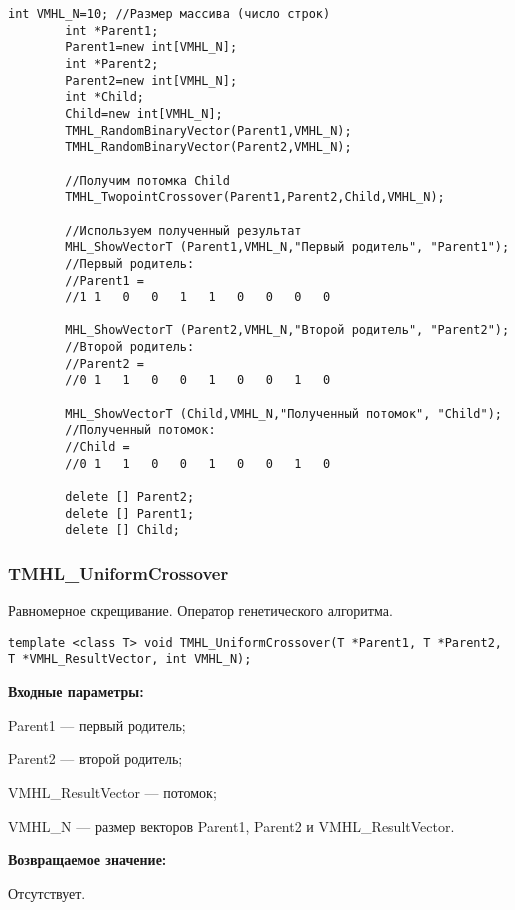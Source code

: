 \documentclass[a4paper,12pt]{article}
\begin{document}
\begin{lstlisting}[label=code_use_TMHL_TwopointCrossover,caption=Пример использования]
        int VMHL_N=10; //Размер массива (число строк)
        int *Parent1;
        Parent1=new int[VMHL_N];
        int *Parent2;
        Parent2=new int[VMHL_N];
        int *Child;
        Child=new int[VMHL_N];
        TMHL_RandomBinaryVector(Parent1,VMHL_N);
        TMHL_RandomBinaryVector(Parent2,VMHL_N);

        //Получим потомка Child
        TMHL_TwopointCrossover(Parent1,Parent2,Child,VMHL_N);

        //Используем полученный результат
        MHL_ShowVectorT (Parent1,VMHL_N,"Первый родитель", "Parent1");
        //Первый родитель:
        //Parent1 =
        //1	1	0	0	1	1	0	0	0	0

        MHL_ShowVectorT (Parent2,VMHL_N,"Второй родитель", "Parent2");
        //Второй родитель:
        //Parent2 =
        //0	1	1	0	0	1	0	0	1	0

        MHL_ShowVectorT (Child,VMHL_N,"Полученный потомок", "Child");
        //Полученный потомок:
        //Child =
        //0	1	1	0	0	1	0	0	1	0

        delete [] Parent2;
        delete [] Parent1;
        delete [] Child;
\end{lstlisting}

\subsubsection{TMHL\_UniformCrossover}\label{TMHL_UniformCrossover}

Равномерное скрещивание. Оператор генетического алгоритма.


\begin{lstlisting}[label=code_syntax_TMHL_UniformCrossover,caption=Синтаксис]
template <class T> void TMHL_UniformCrossover(T *Parent1, T *Parent2, T *VMHL_ResultVector, int VMHL_N);
\end{lstlisting}

\textbf{Входные параметры:}
 
 Parent1 --- первый родитель;
 
 Parent2 --- второй родитель;
 
 VMHL\_ResultVector --- потомок;
 
 VMHL\_N --- размер векторов Parent1, Parent2 и VMHL\_ResultVector.

\textbf{Возвращаемое значение:}

 Отсутствует.
 
\end{document}
